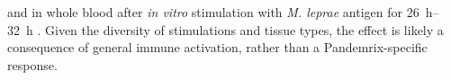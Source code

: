 and in whole blood after \textit{in vitro} stimulation with \textit{M. leprae} antigen for \SIrange{26}{32}{\hour} \autocite{manry2017DecipheringGeneticControl}.
%
Given the diversity of stimulations and tissue types, the effect is likely a consequence of general immune activation, rather than a Pandemrix-specific response.

